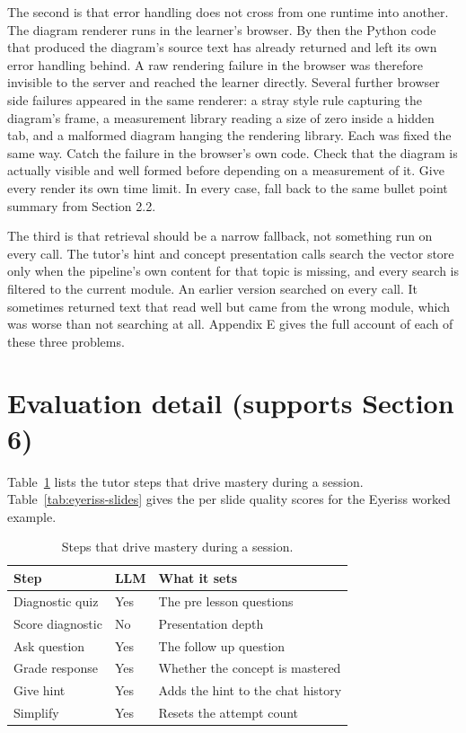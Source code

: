 \documentclass{ecai}
\begin{document}
The second is that error handling does not cross from one runtime into
another. The diagram renderer runs in the learner's browser. By then the Python
code that produced the diagram's source text has already returned and left its
own error handling behind. A raw rendering failure in the browser was therefore
invisible to the server and reached the learner directly. Several further
browser side failures appeared in the same renderer: a stray style rule
capturing the diagram's frame, a measurement library reading a size of zero
inside a hidden tab, and a malformed diagram hanging the rendering library.
Each was fixed the same way. Catch the failure in the browser's own code. Check
that the diagram is actually visible and well formed before depending on a
measurement of it. Give every render its own time limit. In every case, fall
back to the same bullet point summary from Section 2.2.

The third is that retrieval should be a narrow fallback, not something run
on every call. The tutor's hint and concept presentation calls search the
vector store only when the pipeline's own content for that topic is missing,
and every search is filtered to the current module. An earlier version searched
on every call. It sometimes returned text that read well but came from the
wrong module, which was worse than not searching at all. Appendix E gives the
full account of each of these three problems.

\section{Evaluation detail (supports Section 6)}

Table~\ref{tab:eval-nodes} lists the tutor steps that drive mastery during a
session. Table~\ref{tab:eyeriss-slides} gives the per slide quality scores for
the Eyeriss worked example.

\begin{table}[h]
\caption{Steps that drive mastery during a session.}
\label{tab:eval-nodes}
\centering
\small
\begin{tabular}{p{1.8cm}p{0.5cm}p{2.9cm}}
\toprule
\textbf{Step} & \textbf{LLM} & \textbf{What it sets} \\
\midrule
Diagnostic quiz & Yes & The pre lesson questions \\
Score diagnostic & No & Presentation depth \\
Ask question & Yes & The follow up question \\
Grade response & Yes & Whether the concept is mastered \\
Give hint & Yes & Adds the hint to the chat history \\
Simplify & Yes & Resets the attempt count \\
\bottomrule
\end{tabular}
\end{table}
\end{document}
